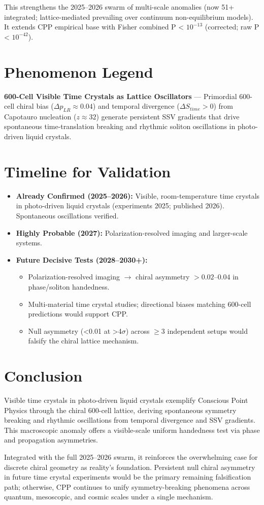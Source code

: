 \documentclass[11pt]{article}
\begin{document}
This strengthens the 2025--2026 swarm of multi-scale anomalies (now 51+ integrated; lattice-mediated prevailing over continuum non-equilibrium models). It extends CPP empirical base with Fisher combined P < $10^{-13}$ (corrected; raw P < $10^{-42}$).

\section{Phenomenon Legend}
\textbf{600-Cell Visible Time Crystals as Lattice Oscillators} — Primordial 600-cell chiral bias ($\Delta p_{LR} \approx 0.04$) and temporal divergence ($\Delta S_{time} > 0$) from Capotauro nucleation ($z \approx 32$) generate persistent SSV gradients that drive spontaneous time-translation breaking and rhythmic soliton oscillations in photo-driven liquid crystals.

\section{Timeline for Validation}
\begin{itemize}
    \item \textbf{Already Confirmed (2025--2026):} Visible, room-temperature time crystals in photo-driven liquid crystals (experiments 2025; published 2026). Spontaneous oscillations verified.
    \item \textbf{Highly Probable (2027):} Polarization-resolved imaging and larger-scale systems.
    \item \textbf{Future Decisive Tests (2028--2030+):}
    \begin{itemize}
        \item Polarization-resolved imaging $\to$ chiral asymmetry $>0.02$--$0.04$ in phase/soliton handedness.
        \item Multi-material time crystal studies; directional biases matching 600-cell predictions would support CPP.
        \item Null asymmetry (<0.01 at >4$\sigma$) across $\geq 3$ independent setups would falsify the chiral lattice mechanism.
    \end{itemize}
\end{itemize}

\section{Conclusion}
Visible time crystals in photo-driven liquid crystals exemplify Conscious Point Physics through the chiral 600-cell lattice, deriving spontaneous symmetry breaking and rhythmic oscillations from temporal divergence and SSV gradients. This macroscopic anomaly offers a visible-scale uniform handedness test via phase and propagation asymmetries.  

Integrated with the full 2025--2026 swarm, it reinforces the overwhelming case for discrete chiral geometry as reality's foundation. Persistent null chiral asymmetry in future time crystal experiments would be the primary remaining falsification path; otherwise, CPP continues to unify symmetry-breaking phenomena across quantum, mesoscopic, and cosmic scales under a single mechanism.
\end{document}
